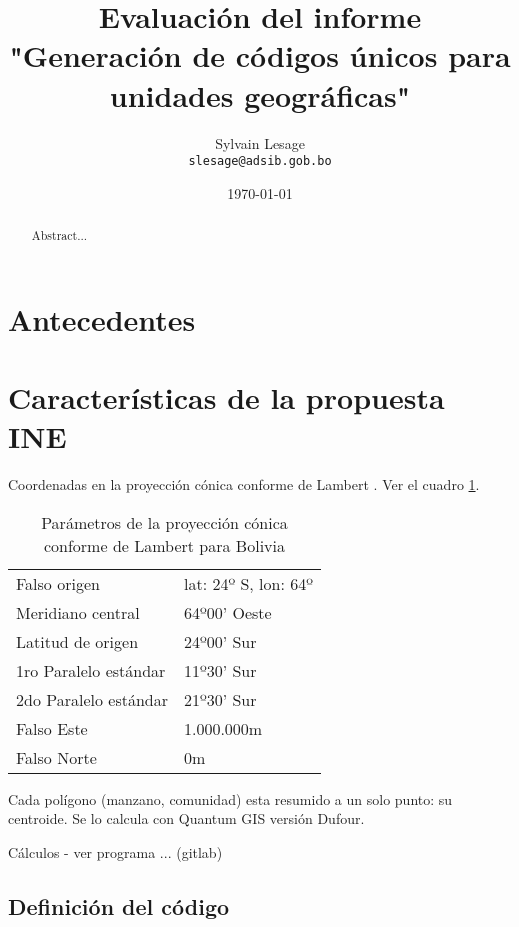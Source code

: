 \documentclass[letterpaper]{article}
\begin{document}
	

\title{Evaluación del informe\\"Generación de códigos únicos para unidades geográficas"}
\author{Sylvain Lesage\\
  \texttt{slesage@adsib.gob.bo}}
\date{\today}
\maketitle
 
\begin{abstract}
Abstract...
\end{abstract}

\section{Antecedentes}

\section{Características de la propuesta INE}

Coordenadas en la proyección cónica conforme de Lambert \cite[p.~33]{sunit07}. Ver el cuadro \ref{tab:lambert}.

\begin{table}
	\centering
	\begin{tabular}{|l|l|}
		\hline
		Falso origen & lat: 24º S, lon: 64º \\
		Meridiano central & 64º00' Oeste \\
		Latitud de origen & 24º00' Sur \\
		1ro Paralelo estándar & 11º30' Sur \\
		2do Paralelo estándar & 21º30' Sur \\
		Falso Este & 1.000.000m \\
		Falso Norte & 0m \\
		\hline	
	\end{tabular}
	\caption{Parámetros de la proyección cónica conforme de Lambert para Bolivia}
	\label{tab:lambert}
\end{table}

Cada polígono (manzano, comunidad) esta resumido a un solo punto: su centroide. Se lo calcula con Quantum GIS versión Dufour.

Cálculos - ver programa ... (gitlab)

\subsection{Definición del código}
\end{document}
